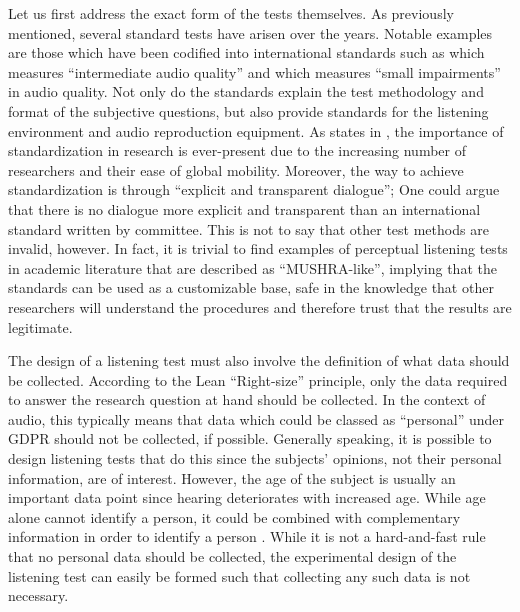 \documentclass{article}
\begin{document}
Let us first address the exact form of the tests themselves. As previously mentioned, several standard tests have arisen over the years. Notable examples are those which have been codified into international standards such as \cite{itu-r-bs-1534_MUSHRA} which measures \enquote{intermediate audio quality} and \cite{itu-r-bs.1116-1MethodsSubjectiveAssessment1997} which measures \enquote{small impairments} in audio quality. Not only do the standards explain the test methodology and format of the subjective questions, but also provide standards for the listening environment and audio reproduction equipment. As \citeauthor{mustajokiNewApproachResearch2017} states in \cite{mustajokiNewApproachResearch2017}, the importance of standardization in research is ever-present due to the increasing number of researchers and their ease of global mobility. Moreover, the way to achieve standardization is through \enquote{explicit and transparent dialogue}; One could argue that there is no dialogue more explicit and transparent than an international standard written by committee. This is not to say that other test methods are invalid, however. In fact, it is trivial to find examples of perceptual listening tests in academic literature that are described as \enquote{MUSHRA-like}, implying that the standards can be used as a customizable base, safe in the knowledge that other researchers will understand the procedures and therefore trust that the results are legitimate.

The design of a listening test must also involve the definition of what data should be collected. According to the Lean \enquote{Right-size} principle, only the data required to answer the research question at hand should be collected. In the context of audio, this typically means that data which could be classed as \enquote{personal} under GDPR \cite{DataProtectionExplained} should not be collected, if possible. Generally speaking, it is possible to design listening tests that do this since the subjects' opinions, not their personal information, are of interest. However, the age of the subject is usually an important data point since hearing deteriorates with increased age. While age alone cannot identify a person, it could be combined with complementary information in order to identify a person \cite{akermanGoodResearchPractice}. While it is not a hard-and-fast rule that no personal data should be collected, the experimental design of the listening test can easily be formed such that collecting any such data is not necessary. 
\end{document}
